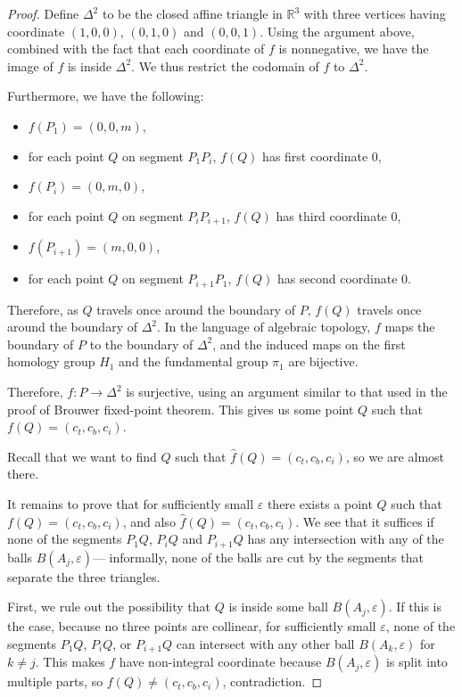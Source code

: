 \documentclass{article}
\theoremstyle{plain}
\newcommand\RR{\mathbb{R}}
\begin{document}
\begin{proof}
	Define $\Delta^2$ to be the closed affine triangle in $\RR^3$ with
	three vertices having coordinate $(1, 0, 0)$, $(0, 1, 0)$ and $(0, 0, 1)$.
	Using the argument above, combined with the fact that each coordinate of $f$ is nonnegative,
	we have the image of $f$ is inside $\Delta^2$.
	We thus restrict the codomain of $f$ to $\Delta^2$.

	Furthermore, we have the following:
	\begin{itemize}
		\item $f(P_1)=(0, 0, m)$,
		\item for each point $Q$ on segment $P_1 P_i$, $f(Q)$ has first coordinate $0$,
		\item $f(P_i)=(0, m, 0)$,
		\item for each point $Q$ on segment $P_i P_{i+1}$, $f(Q)$ has third coordinate $0$,
		\item $f(P_{i+1})=(m, 0, 0)$,
		\item for each point $Q$ on segment $P_{i+1} P_1$, $f(Q)$ has second coordinate $0$.
	\end{itemize}
	Therefore, as $Q$ travels once around the boundary of $P$,
	$f(Q)$ travels once around the boundary of $\Delta^2$.
	In the language of algebraic topology, $f$ maps the boundary of $P$ to the boundary of $\Delta^2$,
	and the induced maps on the first homology group $H_1$ and the fundamental group $\pi_1$ are bijective.

	Therefore, $f \colon P \to \Delta^2$ is surjective,
	using an argument similar to that used in the proof of Brouwer fixed-point theorem.
	This gives us some point $Q$ such that $f(Q) = (c_t, c_b, c_i)$.

	Recall that we want to find $Q$ such that $\hat f(Q) =(c_t, c_b, c_i)$, so we are almost there.

	It remains to prove that for sufficiently small $\varepsilon$ there exists a point $Q$ such that $f(Q) = (c_t, c_b, c_i)$,
	and also $\hat f(Q) = (c_t, c_b, c_i)$.
	We see that it suffices if none of the segments $P_1 Q$, $P_i Q$ and $P_{i+1} Q$
	has any intersection with any of the balls $B(A_j, \varepsilon)$---%
	informally, none of the balls are cut by the segments that separate the three triangles.

	First, we rule out the possibility that $Q$ is inside some ball $B(A_j, \varepsilon)$.
	If this is the case, because no three points are collinear,
	for sufficiently small $\varepsilon$,
	none of the segments $P_1 Q$, $P_i Q$, or $P_{i+1} Q$
	can intersect with any other ball $B(A_k, \varepsilon)$ for $k \neq j$.
	This makes $f$ have non-integral coordinate because $B(A_j, \varepsilon)$ is split into multiple parts,
	so $f(Q) \neq (c_t, c_b, c_i)$, contradiction.


\end{proof}
\end{document}

